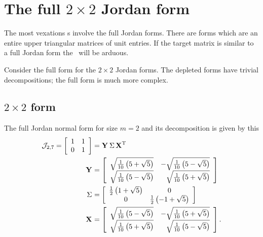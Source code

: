 \section[Full Jordan forms]{The full $2\times2$ Jordan form}
\label{sec:Jordan:full}

The most vexations \svdl s involve the full Jordan forms. There are forms which are an entire upper triangular matrices of unit entries. If the target matrix is similar to a full Jordan form the \svdl \ will be arduous.

Consider the full form for the $2\times2$ Jordan forms. The depleted forms have trivial decompositions; the full form is much more complex.

\subsection{$2\times2$ form}
The full Jordan normal form for size $m=2$ and its decomposition is given by this
\begin{equation}
  \begin{split}
    \mathcal{J}_{2,7} = 
\mat{cc}{
 1 & 1 \\
 0 & 1
}
 &= \svd{T}\\
\Y{}&=\mat{rr}{
 \sqrt{\frac{1}{10} \left(5+\sqrt{5}\right)} & -\sqrt{\frac{1}{10} \left(5-\sqrt{5}\right)} \\
 \sqrt{\frac{1}{10} \left(5-\sqrt{5}\right)} & \sqrt{\frac{1}{10} \left(5+\sqrt{5}\right)}
}\\
\sig{}&=\mat{cc}{
 \frac{1}{2} \left(1+\sqrt{5}\right) & 0 \\
 0 & \frac{1}{2} \left(-1+\sqrt{5}\right)
}
\\
\X{}&=\mat{rr}{
 \sqrt{\frac{1}{10} \left(5-\sqrt{5}\right)} & -\sqrt{\frac{1}{10} \left(5+\sqrt{5}\right)} \\
 \sqrt{\frac{1}{10} \left(5+\sqrt{5}\right)} & \sqrt{\frac{1}{10} \left(5-\sqrt{5}\right)}
}.
  \end{split}
\end{equation}

